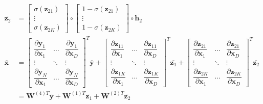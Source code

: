 \documentclass[12pt]{article}
\newcommand{\m}[1]{\mathbf{#1}}
\newcommand{\ol}[1]{\overline{#1}}
\begin{document}
\begin{align*}
    \ol{\m z_2} &= \begin{bmatrix} \sigma(\m z_{21}) \\ \vdots \\ \sigma(\m z_{2K}) \end{bmatrix} \circ \begin{bmatrix} 1 - \sigma(\m z_{21}) \\ \vdots \\ 1 - \sigma(\m z_{2K}) \end{bmatrix} \circ \ol{\m h_2}\\
    \ol{\m x} &= \begin{bmatrix} \dfrac{\partial\m y_1}{\partial\m x_1} & \dots & \dfrac{\partial\m y_1}{\partial\m x_D} \\ \vdots & \ddots & \vdots \\ \dfrac{\partial\m y_N}{\partial\m x_1} & \dots & \dfrac{\partial\m y_N}{\partial\m x_D} \end{bmatrix}^T \ol{\m y} + \begin{bmatrix} \dfrac{\partial\m z_{11}}{\partial\m x_1} & \dots & \dfrac{\partial\m z_{11}}{\partial\m x_D} \\ \vdots & \ddots & \vdots \\ \dfrac{\partial\m z_{1K}}{\partial\m x_1} & \dots & \dfrac{\partial\m z_{1K}}{\partial\m x_D} \end{bmatrix}^T \ol{\m z_1} + \begin{bmatrix} \dfrac{\partial\m z_{21}}{\partial\m x_1} & \dots & \dfrac{\partial\m z_{21}}{\partial\m x_D} \\ \vdots & \ddots & \vdots \\ \dfrac{\partial\m z_{2K}}{\partial\m x_1} & \dots & \dfrac{\partial\m z_{2K}}{\partial\m x_D} \end{bmatrix}^T \ol{\m z_2} \\
    &= \m W^{(4)T} \ol{\m y} + \m W^{(1)T} \ol{\m z_1} + \m W^{(2)T} \ol{\m z_2}
\end{align*}
\end{document}
